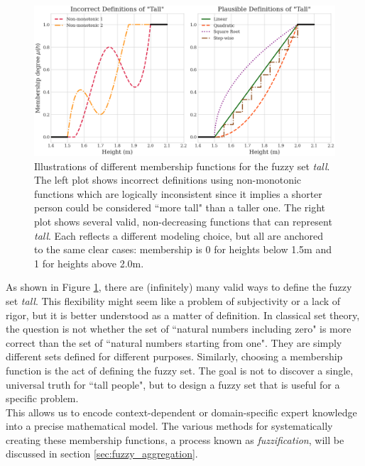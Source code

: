 \begin{figure}[!ht]
    \centering
    \includegraphics[width=\textwidth]{ch1/figures/Fuzzy_tall.png}
    \caption{Illustrations of different membership functions for the fuzzy set \emph{tall}. The left plot shows incorrect definitions using non-monotonic functions which are logically inconsistent since it implies a shorter person could be considered ``more tall" than a taller one. The right plot shows several valid, non-decreasing functions that can represent \emph{tall}. Each reflects a different modeling choice, but all are anchored to the same clear cases: membership is 0 for heights below 1.5m and 1 for heights above 2.0m.}
    \label{fig:tall_definitions}
\end{figure} 

As shown in Figure \ref{fig:tall_definitions}, there are (infinitely) many valid ways to define the fuzzy set \emph{tall}. This flexibility might seem like a problem of subjectivity or a lack of rigor, but it is better understood as a matter of definition. In classical set theory, the question is not whether the set of ``natural numbers including zero" is more correct than the set of ``natural numbers starting from one". They are simply different sets defined for different purposes. Similarly, choosing a membership function is the act of defining the fuzzy set. The goal is not to discover a single, universal truth for ``tall people", but to design a fuzzy set that is useful for a specific problem. \\

This allows us to encode context-dependent or domain-specific expert knowledge into a precise mathematical model. The various methods for systematically creating these membership functions, a process known as \textit{fuzzification}, will be discussed in section \ref{sec:fuzzy_aggregation}.\\

